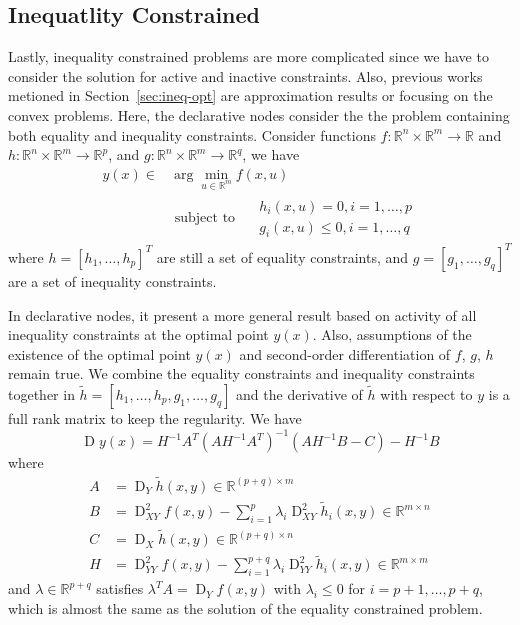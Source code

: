 \subsection{Inequatlity Constrained}
Lastly, inequality constrained problems are more complicated since we have to consider the solution for active and inactive constraints. Also, previous works metioned in Section~\ref{sec:ineq-opt} are approximation results or focusing on the convex problems. Here, the declarative nodes consider the the problem containing both equality and inequality constraints. Consider functions $f: \mathbb{R}^n \times \mathbb{R}^m \rightarrow \mathbb{R}$ and $h: \mathbb{R}^n \times \mathbb{R}^m \rightarrow \mathbb{R}^p$, and $g: \mathbb{R}^n \times \mathbb{R}^m \rightarrow \mathbb{R}^q$, we have
\begin{equation}
    \begin{aligned} 
        y(x) \in & \arg \min _{u \in \mathbb{R}^{m}} f(x, u) \\ & \text { subject to } \quad\begin{array}{l}h_{i}(x, u)=0, i=1, \ldots, p \\ g_{i}(x, u) \leq 0, i=1, \ldots, q\end{array}
    \end{aligned}
\end{equation}
where $h = [h_1, \dots, h_p]^T$ are still a set of equality constraints, and $g = [g_1, \dots, g_q]^T$ are a set of inequality constraints. 
\par In declarative nodes, it present a more general result based on activity of all inequality constraints at the optimal point $y(x)$. Also, assumptions of the existence of the optimal point $y(x)$ and second-order differentiation of $f$, $g$, $h$ remain true. We combine the equality constraints and inequality constraints together in $\tilde{h} = [h_1, \dots, h_p, g_1, \dots, g_q]$ and the derivative of $\tilde{h}$ with respect to $y$ is a full rank matrix to keep the regularity. We have
\begin{equation}
    \label{equ:solution-ineq}
    \operatorname{D} y(x)=H^{-1} A^{T}\left(A H^{-1} A^{T}\right)^{-1}\left(A H^{-1} B-C\right)-H^{-1} B
\end{equation}
where
$$
\begin{aligned} 
    A &=\operatorname{D}_{Y} \tilde{h}(x, y) \in \mathbb{R}^{(p+q) \times m} \\ B &=\operatorname{D}_{X Y}^{2} f(x, y)-\sum_{i=1}^{p} \lambda_{i} \operatorname{D}_{X Y}^{2} \tilde{h}_{i}(x, y) \in \mathbb{R}^{m \times n} \\ C &=\operatorname{D}_{X} \tilde{h}(x, y) \in \mathbb{R}^{(p+q) \times n} \\ H &=\operatorname{D}_{Y Y}^{2} f(x, y)-\sum_{i=1}^{p+q} \lambda_{i} \operatorname{D}_{Y Y}^{2} \tilde{h}_{i}(x, y) \in \mathbb{R}^{m \times m} 
\end{aligned}
$$
and $\lambda \in \mathbb{R}^{p+q}$ satisfies $\lambda ^T A = \operatorname{D}_Yf(x,y)$ with $\lambda_i \leq 0$ for $i = p+1, \dots, p+q$, which is almost the same as the solution of the equality constrained problem. 

